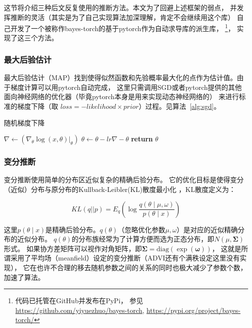 \documentclass{sicnuthesis}
\begin{document}
这节将介绍三种后文反复使用的推断方法。本文为了回避上述框架的弱点，
并发挥推断的灵活（其实是为了自己实现算法加深理解，肯定不会继续用这个库）
自己开发了一个被称作bayes-torch的基于pytorch作为自动求导库的派生库，
\footnote{代码已托管在GitHub并发布在PyPi，
参见\url{https://github.com/yiyuezhuo/bayes-torch}, \url{https://pypi.org/project/bayes-torch/}}，
实现了这三个方法。

\subsubsection{最大后验估计}


最大后验估计（MAP）找到使得似然函数和先验概率最大化的点作为估计值。由于梯度计算可以用pytorch自动完成，
这里只需调用SGD或者pytorch提供的其他面向神经网络的优化器（毕竟pytorch本身是用来实现动态神经网络的）
来进行标准的梯度下降（取 $loss = -likelihood \times prior$）过程。见算法~\ref{alg:sgd}。

\begin{algorithm}
\caption{随机梯度下降}
\begin{algorithmic}[1]
 
        \State $\nabla \gets (\nabla_\theta \log(x,\theta)|_{\theta})$
        \State $\theta \gets \theta - lr \nabla -\theta$
    \EndFor
    \State \textbf{return} $\theta$
\EndProcedure
\end{algorithmic}
\label{alg:sgd}
\end{algorithm}

\subsubsection{变分推断}


变分推断使用简单的分布区近似复杂的精确后验分布。
它的优化目标是使得变分（近似）分布与原分布的Kullback-Leibler(KL)散度最小化
\cite{blei2017variational}，KL散度定义为：

$$
KL(q||p) = E_q \left( \log \frac{q(\theta \mid \mu,\omega)}{p(\theta \mid x)} \right)
$$


这里$p(\theta \mid x)$是精确后验分布。$q(\theta)$（忽略优化参数$\mu,\omega$）是对应的近似精确分布的近似分布。
$q(\theta)$的分布族经常为了计算方便而选为正态分布，即$N(\mu,\mathbf{\Sigma})$形式。
如果协方差矩阵可以视作对角矩阵，即$\mathbf{\Sigma}=\mathrm{diag}(\exp(\mathbf{\omega}))$，
这就是所谓采用了平均场（meanfield）设定的变分推断（ADVI还有个满秩设定这里没有实现），
它在也许不合理的移去随机参数之间的关系的同时也极大减少了参数个数，加速了算法。
\end{document}
